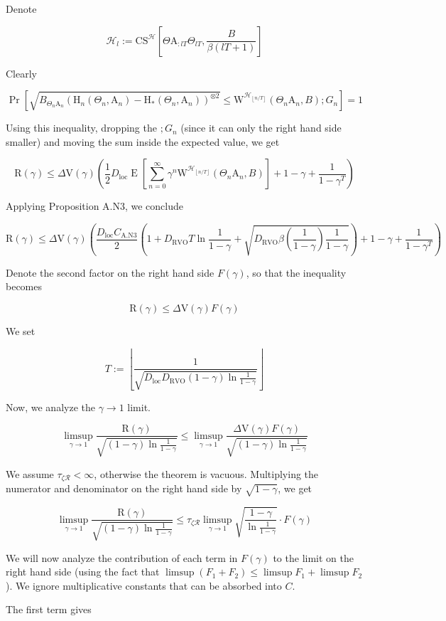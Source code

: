 \documentclass[a4paper]{article}
\newcommand{\AP}[1]{\left(#1\right)}
\newcommand{\AB}[1]{\left[#1\right]}
\newcommand{\Pa}[2]{\underset{#1}{\operatorname{Pr}}\AB{#2}}
\newcommand{\Ea}[2]{\underset{#1}{\operatorname{E}}\AB{#2}}
\newcommand{\Floor}[1]{\left\lfloor #1 \right\rfloor}
\newcommand{\B}{B}
\newcommand{\R}{\mathcal{R}}
\newcommand{\Hy}{\mathcal{H}}
\newcommand{\DRVO}{D_{\mathrm{RVO}}}
\newcommand{\DL}{D_{\mathrm{loc}}}
\newcommand{\V}{\mathrm{V}}
\newcommand{\Reg}{\mathrm{R}}
\newcommand{\CS}{\mathrm{CS}}
\newcommand{\W}{\mathrm{W}}
\newcommand{\AT}{\mathrm{A}}
\newcommand{\THy}{\mathrm{H}_*}
\newcommand{\SHy}{\mathrm{H}}
\newcommand{\De}{\Delta}
\newcommand{\CSE}{G}
\begin{document}
Denote

$$\Hy_l:=\CS^\Hy\AB{\Theta\AT_{:lT}\Theta_{lT},\frac{\B }{\beta(lT+1)}}$$

Clearly

$$\Pa{}{\sqrt{B_{\Theta_n\AT_n}\AP{\SHy_n\AP{\Theta_n,\AT_n}-\THy\AP{\Theta_n,\AT_n}}^{\otimes2}}\leq\W^{\Hy_{\Floor{n/T}}}\AP{\Theta_n\AT_n,B};\CSE_n}=1$$

Using this inequality, dropping the $;G_n$ (since it can only the right hand side smaller) and moving the sum inside the expected value, we get

$$\Reg(\gamma)\leq\Delta\V(\gamma)\AP{\frac{1}{2}\DL\Ea{}{\sum_{n=0}^\infty\gamma^{n}\W^{\Hy_{\Floor{n/T}}}\AP{\Theta_n\AT_n,B} }+1-\gamma+\frac{1}{1-\gamma^T}}$$

Applying Proposition A.N3, we conclude

$$\Reg(\gamma)\leq\Delta\V(\gamma)\AP{\frac{\DL C_{\mathrm{A.N3}}}{2}\AP{1+\DRVO T\ln\frac{1}{1-\gamma}+\sqrt{\DRVO\beta\AP{\frac{1}{1-\gamma}}\frac{1}{1-\gamma}}}+1-\gamma+\frac{1}{1-\gamma^T}}$$

Denote the second factor on the right hand side $F(\gamma)$, so that the inequality becomes 

$$\Reg(\gamma)\leq\De\V(\gamma)F(\gamma)$$

We set

$$T:=\Floor{\frac{1}{\sqrt{\DL\DRVO(1-\gamma)\ln\frac{1}{1-\gamma}}}}$$

Now, we analyze the $\gamma\rightarrow1$ limit.

$$\limsup_{\gamma\rightarrow1}{\frac{\Reg(\gamma)}{\sqrt{(1-\gamma)\ln{\frac{1}{1-\gamma}}}}}\leq \limsup_{\gamma\rightarrow1}{\frac{\De\V(\gamma)F(\gamma)}{\sqrt{(1-\gamma)\ln{\frac{1}{1-\gamma}}}}}$$

We assume $\tau_{\zeta\R}<\infty$, otherwise the theorem is vacuous. Multiplying the numerator and denominator on the right hand side by $\sqrt{1-\gamma}$, we get

$$\limsup_{\gamma\rightarrow1}{\frac{\Reg(\gamma)}{\sqrt{(1-\gamma)\ln{\frac{1}{1-\gamma}}}}}\leq  \tau_{\zeta\R}\limsup_{\gamma\rightarrow1}{\sqrt{\frac{1-\gamma}{\ln{\frac{1}{1-\gamma}}}}\cdot F(\gamma)}$$

We will now analyze the contribution of each term in $F(\gamma)$ to the limit on the right hand side (using the fact that $\limsup\AP{F_1+F_2}\leq\limsup{F_1}+\limsup{F_2}$). We ignore multiplicative constants that can be absorbed into $C$.

The first term gives
\end{document}
